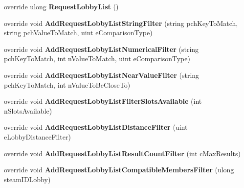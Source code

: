 \begin{DoxyCompactItemize}
override ulong {\bfseries Request\+Lobby\+List} ()
\item 
\mbox{\label{class_valve_1_1_steamworks_1_1_c_steam_matchmaking_ad7bbabee0edfd9cd0631a5d21bff53c1}} 
override void {\bfseries Add\+Request\+Lobby\+List\+String\+Filter} (string pch\+Key\+To\+Match, string pch\+Value\+To\+Match, uint e\+Comparison\+Type)
\item 
\mbox{\label{class_valve_1_1_steamworks_1_1_c_steam_matchmaking_a59b39c7e0dccdacb357d09286905af50}} 
override void {\bfseries Add\+Request\+Lobby\+List\+Numerical\+Filter} (string pch\+Key\+To\+Match, int n\+Value\+To\+Match, uint e\+Comparison\+Type)
\item 
\mbox{\label{class_valve_1_1_steamworks_1_1_c_steam_matchmaking_a1b583e949a25268e83ce7d26db7792cd}} 
override void {\bfseries Add\+Request\+Lobby\+List\+Near\+Value\+Filter} (string pch\+Key\+To\+Match, int n\+Value\+To\+Be\+Close\+To)
\item 
\mbox{\label{class_valve_1_1_steamworks_1_1_c_steam_matchmaking_aaf82e555d8886af4338b76b3cadc5725}} 
override void {\bfseries Add\+Request\+Lobby\+List\+Filter\+Slots\+Available} (int n\+Slots\+Available)
\item 
\mbox{\label{class_valve_1_1_steamworks_1_1_c_steam_matchmaking_ab86c22e70d152c56420ab8756550211a}} 
override void {\bfseries Add\+Request\+Lobby\+List\+Distance\+Filter} (uint e\+Lobby\+Distance\+Filter)
\item 
\mbox{\label{class_valve_1_1_steamworks_1_1_c_steam_matchmaking_a8fa5cee5cad857513eefb6151200ac21}} 
override void {\bfseries Add\+Request\+Lobby\+List\+Result\+Count\+Filter} (int c\+Max\+Results)
\item 
\mbox{\label{class_valve_1_1_steamworks_1_1_c_steam_matchmaking_a04ee4ec68751ead938cf98fcc8730def}} 
override void {\bfseries Add\+Request\+Lobby\+List\+Compatible\+Members\+Filter} (ulong steam\+I\+D\+Lobby)

\end{DoxyCompactItemize}
